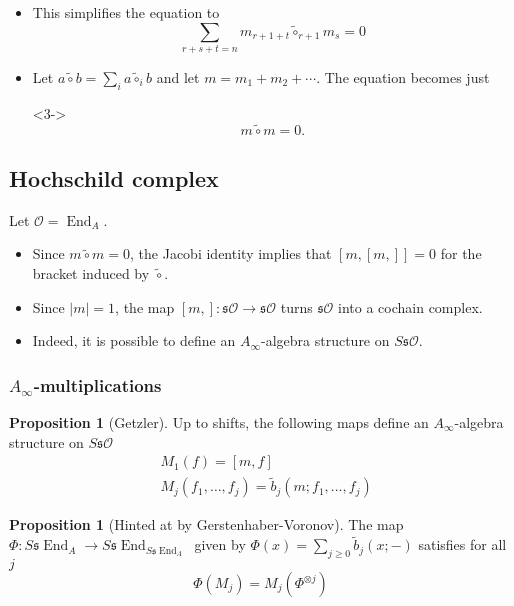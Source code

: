\documentclass{beamer}
\theoremstyle{definition}
\newtheorem{prop}[theo]{Proposition}
\newcommand{\OO}{\mathcal{O}}
\newcommand{\s}{\mathfrak{s}}
\DeclareMathOperator{\End}{End}
\begin{document}
\begin{frame}
\begin{itemize}
\item<1-> This simplifies the equation to
\[\sum_{r+s+t=n}m_{r+1+t}\tilde{\circ}_{r+1}m_s=0\] %
\item<2-> Let $a\tilde{\circ}b=\sum_{i}a\tilde{\circ}_ib$ and let $m=m_1+m_2+\cdots$. The equation becomes just
\item[]<3-> \[m\tilde{\circ}m=0.\]
\end{itemize}
\end{frame}
\subsection{Hochschild complex}

\begin{frame}
Let $\OO=\End_A$.
\begin{itemize}
\item<1-> Since $m\tilde{\circ}m=0$, the Jacobi identity implies that $[m,[m,]]=0$ for the bracket induced by $\tilde{\circ}$.
\item<2-> Since $|m|=1$, the map $[m,]:\s\OO\to \s\OO$ turns $\s\OO$ into a cochain complex.
\item<3-> Indeed, it is possible to define an $A_\infty$-algebra structure on $S\s\OO$. 
\end{itemize}
\end{frame}
\begin{frame}
\frametitle{$A_\infty$-multiplications}
\begin{prop}[Getzler]
Up to shifts, the following maps define an $A_\infty$-algebra structure on $S\s\OO$
\begin{align*}
&M_1(f)=[m,f]\\ %
&M_j(f_1,\dots, f_j)=\tilde{b}_j(m;f_1,\dots, f_j) %
\end{align*}
\end{prop}\pause

\begin{prop}[Hinted at by Gerstenhaber-Voronov]
The map $\Phi:S\s\End_A\to S\s\End_{S\s\End_A}$ given by $\Phi(x)= \sum_{j\geq 0} \tilde{b}_j(x;-)$ satisfies for all $j$
\[\Phi(M_j) = M_j(\Phi^{\otimes j})\]
\end{prop}
\end{frame}
\end{document}
